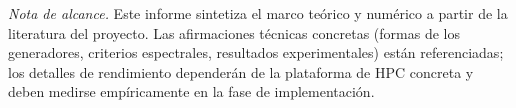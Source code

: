 \documentclass[11pt,a4paper]{article}
\theoremstyle{definition}
\theoremstyle{plain}
\begin{document}
\bigskip
\noindent\textit{Nota de alcance.} Este informe sintetiza el marco teórico y numérico a partir de la
literatura del proyecto. Las afirmaciones técnicas concretas (formas de los generadores, criterios
espectrales, resultados experimentales) están referenciadas; los detalles de rendimiento dependerán de la
plataforma de HPC concreta y deben medirse empíricamente en la fase de implementación.



\end{document}

